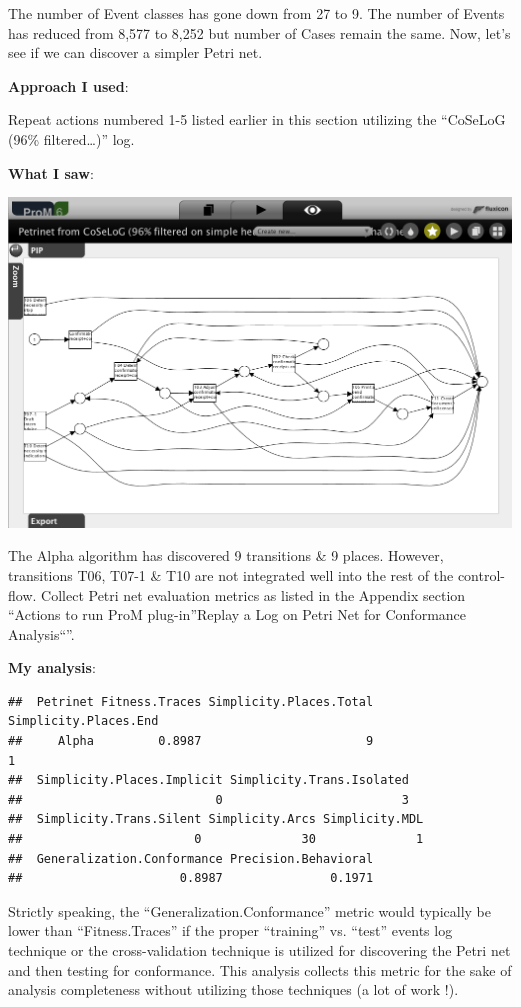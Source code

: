 \documentclass[]{article}
\begin{document}
The number of Event classes has gone down from 27 to 9. The number of
Events has reduced from 8,577 to 8,252 but number of Cases remain the
same. Now, let's see if we can discover a simpler Petri net.

\textbf{Approach I used}:

Repeat actions numbered 1-5 listed earlier in this section utilizing the
``CoSeLoG (96\% filtered\ldots{})'' log.

\textbf{What I saw}:

\includegraphics{CoSeLoG_Step_05_Filter96_PetriNet_Alpha.png}

The Alpha algorithm has discovered 9 transitions \& 9 places. However,
transitions T06, T07-1 \& T10 are not integrated well into the rest of
the control-flow. Collect Petri net evaluation metrics as listed in the
Appendix section ``Actions to run ProM plug-in''Replay a Log on Petri
Net for Conformance Analysis``''.

\textbf{My analysis}:

\begin{verbatim}
##  Petrinet Fitness.Traces Simplicity.Places.Total Simplicity.Places.End
##     Alpha         0.8987                       9                     1
##  Simplicity.Places.Implicit Simplicity.Trans.Isolated
##                           0                         3
##  Simplicity.Trans.Silent Simplicity.Arcs Simplicity.MDL
##                        0              30              1
##  Generalization.Conformance Precision.Behavioral
##                      0.8987               0.1971
\end{verbatim}

Strictly speaking, the ``Generalization.Conformance'' metric would
typically be lower than ``Fitness.Traces'' if the proper ``training''
vs. ``test'' events log technique or the cross-validation technique is
utilized for discovering the Petri net and then testing for conformance.
This analysis collects this metric for the sake of analysis completeness
without utilizing those techniques (a lot of work !).
\end{document}
